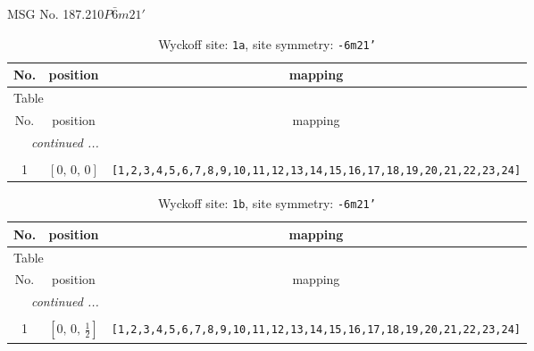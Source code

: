 \documentclass[fleqn,8pt]{jsarticle}
\begin{document}
\setcounter{MaxMatrixCols}{32}

\renewcommand{\tablename}{Table~}
\renewcommand{\figurename}{Figure~}
\begin{center}
\LARGE
MSG No. 187.210\quad$P\bar{6}m21'$
\end{center}
\renewcommand{\arraystretch}{1.2}
\begin{longtable}{ccc}
\caption{Wyckoff site: {\tt 1a}, site symmetry: {\tt -6m21'}}
 \\
 \hline \hline
No. & position & mapping \\ \hline \endfirsthead

\multicolumn{2}{l}{\tablename\ \thetable{}} \\
 \hline \hline
No. & position & mapping \\ \hline \endhead

 \hline \hline
\multicolumn{2}{r}{\footnotesize\it continued ...} \\ \endfoot

 \hline \hline
\multicolumn{2}{r}{} \\ \endlastfoot

1 & $\left[ 0,\, 0,\, 0 \right]$ & {\tt [1,2,3,4,5,6,7,8,9,10,11,12,13,14,15,16,17,18,19,20,21,22,23,24]} \\
\end{longtable}
\renewcommand{\arraystretch}{1.2}
\begin{longtable}{ccc}
\caption{Wyckoff site: {\tt 1b}, site symmetry: {\tt -6m21'}}
 \\
 \hline \hline
No. & position & mapping \\ \hline \endfirsthead

\multicolumn{2}{l}{\tablename\ \thetable{}} \\
 \hline \hline
No. & position & mapping \\ \hline \endhead

 \hline \hline
\multicolumn{2}{r}{\footnotesize\it continued ...} \\ \endfoot

 \hline \hline
\multicolumn{2}{r}{} \\ \endlastfoot

1 & $\left[ 0,\, 0,\, \frac{1}{2} \right]$ & {\tt [1,2,3,4,5,6,7,8,9,10,11,12,13,14,15,16,17,18,19,20,21,22,23,24]} \\
\end{longtable}
\renewcommand{\arraystretch}{1.2}
\end{document}
